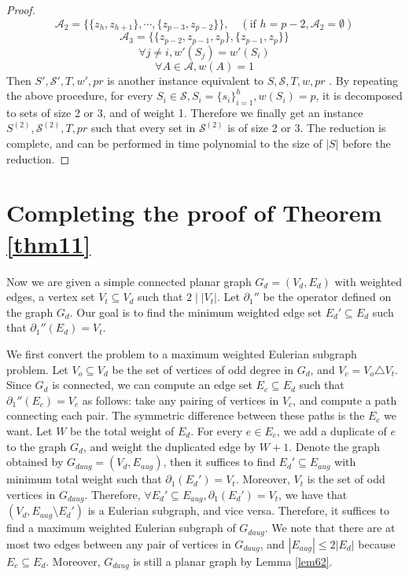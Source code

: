 \documentclass[10pt,fleqn]{article}
\newcommand{\rs}{\setminus}
\newcommand{\mc}[1]{\mathcal{#1}}
\begin{document}
\begin{proof}
		$$\mc{A}_2=\{\{z_h,z_{h+1}\},\cdots,\{z_{p-3},z_{p-2}\}\},\quad (\text{if }h=p-2,\mc{A}_2=\emptyset)$$
		$$\mc{A}_3=\{\{z_{p-2},z_{p-1},z_p\},\{z_{p-1},z_p\}\}$$
		$$\forall j\neq i, w'(S_j)=w'(S_i)$$
		$$\forall A\in\mc{A},w(A)=1$$
		Then $S',\mc{S}',T,w',pr$ is another instance equivalent to $S,\mc{S},T,w,pr$ . By repeating the above procedure, for every $S_i\in\mc{S},S_i=\{s_i\}_{i=1}^h,w(S_i)=p$, it is decomposed to sets of size 2 or 3, and of weight 1. Therefore we finally get an instance $S^{(2)},\mc{S}^{(2)},T,pr$ such that every set in $\mc{S}^{(2)}$ is of size 2 or 3. The reduction is complete, and can be performed in time polynomial to the size of $|S|$ before the reduction.
	\end{proof}
	
	\section{Completing the proof of Theorem \ref{thm11}}\label{a2}
	Now we are given a simple connected planar graph $G_d=(V_d,E_d)$ with weighted edges, a vertex set $V_t\subseteq V_d$ such that $2\mid|V_t|$. Let $\partial_1''$ be the operator defined on the graph $G_d$. Our goal is to find the minimum weighted edge set $E_d'\subseteq E_d$ such that $\partial_1''(E_d)=V_t$. \par
	We first convert the problem to a maximum weighted Eulerian subgraph problem. Let $V_o\subseteq V_d$ be the set of vertices of odd degree in $G_d$, and $V_c=V_o\triangle V_t$. Since $G_d$ is connected, we can compute an edge set $E_c\subseteq E_d$ such that $\partial_1''(E_c)=V_c$ as follows: take any pairing of vertices in $V_c$, and compute a path connecting each pair. The symmetric difference between these paths is the $E_c$ we want. Let $W$ be the total weight of $E_d$. For every $e\in E_c$, we add a duplicate of $e$ to the graph $G_d$, and weight the duplicated edge by $W+1$. Denote the graph obtained by $G_{daug}=(V_d,E_{aug})$, then it suffices to find $E_d'\subseteq E_{aug}$ with minimum total weight such that $\partial_1(E_d')=V_t$. Moreover, $V_t$ is the set of odd vertices in $G_{daug}$. Therefore, $\forall E_d'\subseteq E_{aug},\partial_1(E_d')=V_t$, we have that $(V_d,E_{aug}\rs E_d')$ is a Eulerian subgraph, and vice versa. Therefore, it suffices to find a maximum weighted Eulerian subgraph of $G_{daug}$. We note that there are at most two edges between any pair of vertices in $G_{daug}$, and $|E_{aug}|\leq 2|E_d|$ because $E_c\subseteq E_d$. Moreover, $G_{daug}$ is still a planar graph by Lemma \ref{lem62}. \par
\end{document}
